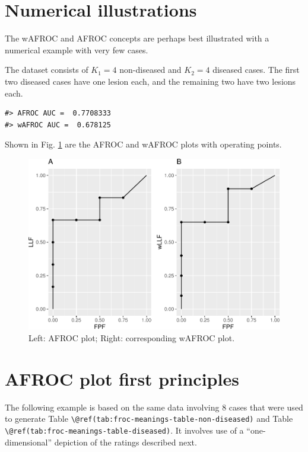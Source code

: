 \documentclass[
]{book}
\begin{document}
\hypertarget{froc-meanings-numerical-illustrations}{%
\section{Numerical illustrations}\label{froc-meanings-numerical-illustrations}}

The wAFROC and AFROC concepts are perhaps best illustrated with a numerical example with very few cases.

The dataset consists of \(K_1 = 4\) non-diseased and \(K_2 = 4\) diseased cases. The first two diseased cases have one lesion each, and the remaining two have two lesions each.

\begin{verbatim}
#> AFROC AUC =  0.7708333
#> wAFROC AUC =  0.678125
\end{verbatim}

Shown in Fig. \ref{fig:plots-p1-p2} are the AFROC and wAFROC plots with operating points.

\begin{figure}
\centering
\includegraphics{14-meanings-foms_files/figure-latex/plots-p1-p2-1.pdf}
\caption{\label{fig:plots-p1-p2}Left: AFROC plot; Right: corresponding wAFROC plot.}
\end{figure}

\hypertarget{froc-meanings-AFROC-plot-first-principles}{%
\section{AFROC plot first principles}\label{froc-meanings-AFROC-plot-first-principles}}

The following example is based on the same data involving 8 cases that were used to generate Table \texttt{\textbackslash{}@ref(tab:froc-meanings-table-non-diseased)} and Table \texttt{\textbackslash{}@ref(tab:froc-meanings-table-diseased)}. It involves use of a ``one-dimensional'' depiction of the ratings described next.
\end{document}
